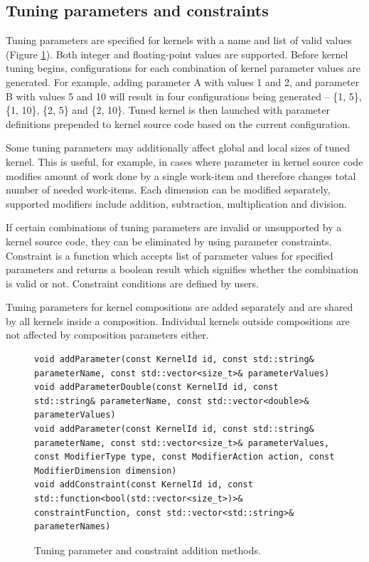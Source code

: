 \documentclass
[
    digital, %
    oneside, %
    table, %
    nolof, %
    nolot, %
    nocover %
]{fithesis3}
\begin{document}
\subsection{Tuning parameters and constraints}
\label{ktt-tuning-parameters}
Tuning parameters are specified for kernels with a name and list of valid values (Figure \ref{ktt-parameter-methods}). Both integer and floating-point
values are supported. Before kernel tuning begins, configurations for each combination of kernel parameter values are generated. For example, adding
parameter A with values 1 and 2, and parameter B with values 5 and 10 will result in four configurations being generated -- \{1, 5\}, \{1, 10\}, \{2, 5\}
and \{2, 10\}. Tuned kernel is then launched with parameter definitions prepended to kernel source code based on the current configuration.

Some tuning parameters may additionally affect global and local sizes of tuned kernel. This is useful, for example, in cases where parameter in kernel
source code modifies amount of work done by a single work-item and therefore changes total number of needed work-items. Each dimension can be modified
separately, supported modifiers include addition, subtraction, multiplication and division.

If certain combinations of tuning parameters are invalid or unsupported by a kernel source code, they can be eliminated by using parameter constraints.
Constraint is a function which accepts list of parameter values for specified parameters and returns a boolean result which signifies whether the
combination is valid or not. Constraint conditions are defined by users.

Tuning parameters for kernel compositions are added separately and are shared by all kernels inside a composition. Individual kernels outside compositions
are not affected by composition parameters either.

\begin{figure}
\begin{adjustwidth}{-1cm}{-1cm}
\begin{lstlisting}
void addParameter(const KernelId id, const std::string& parameterName, const std::vector<size_t>& parameterValues)
void addParameterDouble(const KernelId id, const std::string& parameterName, const std::vector<double>& parameterValues)
void addParameter(const KernelId id, const std::string& parameterName, const std::vector<size_t>& parameterValues, const ModifierType type, const ModifierAction action, const ModifierDimension dimension)
void addConstraint(const KernelId id, const std::function<bool(std::vector<size_t>)>& constraintFunction, const std::vector<std::string>& parameterNames)
\end{lstlisting}
\caption{Tuning parameter and constraint addition methods.}
\label{ktt-parameter-methods}
\end{adjustwidth}
\end{figure}
\end{document}
